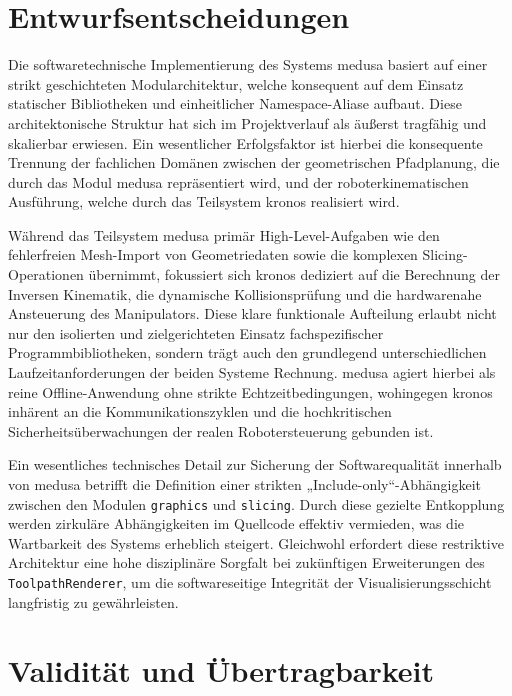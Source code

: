    \section{Entwurfsentscheidungen} \label{sec:discussion-design-decisions}
      Die softwaretechnische Implementierung des Systems \ac{medusa} basiert auf einer strikt geschichteten Modularchitektur, welche konsequent auf dem Einsatz statischer Bibliotheken und einheitlicher Namespace-Aliase aufbaut.
      Diese architektonische Struktur hat sich im Projektverlauf als äußerst tragfähig und skalierbar erwiesen.
      Ein wesentlicher Erfolgsfaktor ist hierbei die konsequente Trennung der fachlichen Domänen zwischen der geometrischen Pfadplanung, die durch das Modul \ac{medusa} repräsentiert wird, und der roboterkinematischen Ausführung, welche durch das Teilsystem \ac{kronos} realisiert wird.

      Während das Teilsystem \ac{medusa} primär High-Level-Aufgaben wie den fehlerfreien Mesh-Import von Geometriedaten sowie die komplexen Slicing-Operationen übernimmt, fokussiert sich \ac{kronos} dediziert auf die Berechnung der Inversen Kinematik, die dynamische Kollisionsprüfung und die hardwarenahe Ansteuerung des Manipulators.
      Diese klare funktionale Aufteilung erlaubt nicht nur den isolierten und zielgerichteten Einsatz fachspezifischer Programmbibliotheken, sondern trägt auch den grundlegend unterschiedlichen Laufzeitanforderungen der beiden Systeme Rechnung.
      \ac{medusa} agiert hierbei als reine Offline-Anwendung ohne strikte Echtzeitbedingungen, wohingegen \ac{kronos} inhärent an die Kommunikationszyklen und die hochkritischen Sicherheitsüberwachungen der realen Robotersteuerung gebunden ist.

      Ein wesentliches technisches Detail zur Sicherung der Softwarequalität innerhalb von \ac{medusa} betrifft die Definition einer strikten „Include-only“-Abhängigkeit zwischen den Modulen \texttt{graphics} und \texttt{slicing}.
      Durch diese gezielte Entkopplung werden zirkuläre Abhängigkeiten im Quellcode effektiv vermieden, was die Wartbarkeit des Systems erheblich steigert.
      Gleichwohl erfordert diese restriktive Architektur eine hohe disziplinäre Sorgfalt bei zukünftigen Erweiterungen des \texttt{ToolpathRenderer}, um die softwareseitige Integrität der Visualisierungsschicht langfristig zu gewährleisten.

  \section{Validität und Übertragbarkeit} \label{sec:validity-and-transferability}
